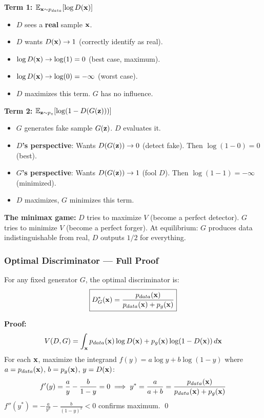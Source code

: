 \begin{keybox}
\textbf{Term 1: $\mathbb{E}_{\mathbf{x} \sim p_{data}}[\log D(\mathbf{x})]$}
\begin{itemize}
\item $D$ sees a \textbf{real} sample $\mathbf{x}$.
\item $D$ wants $D(\mathbf{x}) \to 1$ (correctly identify as real).
\item $\log D(\mathbf{x}) \to \log(1) = 0$ (best case, maximum).
\item $\log D(\mathbf{x}) \to \log(0) = -\infty$ (worst case).
\item $D$ maximizes this term. $G$ has no influence.
\end{itemize}

\textbf{Term 2: $\mathbb{E}_{\mathbf{z} \sim p_z}[\log(1 - D(G(\mathbf{z})))]$}
\begin{itemize}
\item $G$ generates fake sample $G(\mathbf{z})$. $D$ evaluates it.
\item \textbf{$D$'s perspective}: Wants $D(G(\mathbf{z})) \to 0$ (detect fake). Then $\log(1-0) = 0$ (best).
\item \textbf{$G$'s perspective}: Wants $D(G(\mathbf{z})) \to 1$ (fool $D$). Then $\log(1-1) = -\infty$ (minimized).
\item $D$ maximizes, $G$ minimizes this term.
\end{itemize}

\textbf{The minimax game:}
$D$ tries to maximize $V$ (become a perfect detector). $G$ tries to minimize $V$ (become a perfect forger). At equilibrium: $G$ produces data indistinguishable from real, $D$ outputs $1/2$ for everything.
\end{keybox}

\subsubsection{Optimal Discriminator — Full Proof}
\begin{theorem}
For any fixed generator $G$, the optimal discriminator is:
\begin{equation}
\boxed{D^*_G(\mathbf{x}) = \frac{p_{data}(\mathbf{x})}{p_{data}(\mathbf{x}) + p_g(\mathbf{x})}}
\end{equation}
\end{theorem}

\textbf{Proof:}
$$V(D,G) = \int_{\mathbf{x}} p_{data}(\mathbf{x})\log D(\mathbf{x}) + p_g(\mathbf{x})\log(1-D(\mathbf{x}))\,d\mathbf{x}$$
For each $\mathbf{x}$, maximize the integrand $f(y) = a\log y + b\log(1-y)$ where $a = p_{data}(\mathbf{x})$, $b = p_g(\mathbf{x})$, $y = D(\mathbf{x})$:
$$f'(y) = \frac{a}{y} - \frac{b}{1-y} = 0 \implies y^* = \frac{a}{a+b} = \frac{p_{data}(\mathbf{x})}{p_{data}(\mathbf{x})+p_g(\mathbf{x})}$$
$f''(y^*) = -\frac{a}{y^2}-\frac{b}{(1-y)^2} < 0$ confirms maximum. \qed

